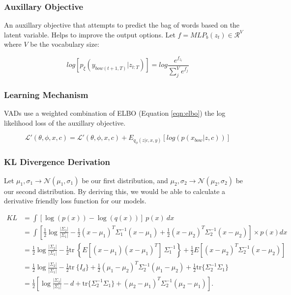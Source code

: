 \documentclass[12pt,twoside]{report}
\begin{document}
\subsubsection{Auxillary Objective}

An auxillary objective that attempts to predict the bag of words based on the latent variable. Helps to improve the output options. Let $f=MLP_b(z_t) \in \mathcal{R}^V$ where $V$ be the vocabulary size:

\begin{equation}
	log [p_\xi(y_{bow(t+1,T)}|z_{t:T}) ] = log  \frac{e^{f_{z_{t}}}}{\sum^V_j e^{f_{j}}}
\end{equation}

\subsubsection{Learning Mechanism}

VADs use a weighted combination of ELBO (Equation \ref{eqn:elbo})  the log likelihood loss of the auxillary objective.

\begin{equation}
	\mathcal{L}'(\theta, \phi, x, c) =\mathcal{L}'(\theta, \phi, x, c) + E_{q_{\phi}(z|c,x,y)}[log(p(x_{bow}|z,c))]
\end{equation}

\subsubsection{KL Divergence Derivation}

Let $\mu_1, \sigma_1 \rightarrow \mathcal{N}(\mu_1,\sigma_1)$ be our first distribution, and $\mu_2, \sigma_2 \rightarrow \mathcal{N}(\mu_2,\sigma_2)$ be our second distribution. By deriving this, we would be able to calculate a derivative friendly loss function for our models.

\begin{equation}
	\label{eq:t}
	\begin{aligned}
	KL &= \int \left[\log( p(x)) - \log( q(x)) \right]\ p(x)\ dx \\
	&= \int \left[ \frac{1}{2} \log\frac{|\Sigma_2|}{|\Sigma_1|} - \frac{1}{2} (x-\mu_1)^T\Sigma_1^{-1}(x-\mu_1) + \frac{1}{2} (x-\mu_2)^T\Sigma_2^{-1}(x-\mu_2) \right] \times p(x) dx \\
	&= \frac{1}{2} \log\frac{|\Sigma_2|}{|\Sigma_1|} - \frac{1}{2} \text{tr}\ \left\{E[(x - \mu_1)(x - \mu_1)^T] \ \Sigma_1^{-1} \right\} + \frac{1}{2} E[(x - \mu_2)^T \Sigma_2^{-1} (x - \mu_2)] \\
	&= \frac{1}{2} \log\frac{|\Sigma_2|}{|\Sigma_1|} - \frac{1}{2} \text{tr}\ \{I_d \} + \frac{1}{2} (\mu_1 - \mu_2)^T \Sigma_2^{-1} (\mu_1 - \mu_2) + \frac{1}{2} \text{tr} \{ \Sigma_2^{-1} \Sigma_1 \} \\
	&= \frac{1}{2}\left[\log\frac{|\Sigma_2|}{|\Sigma_1|} - d + \text{tr} \{ \Sigma_2^{-1}\Sigma_1 \} + (\mu_2 - \mu_1)^T \Sigma_2^{-1}(\mu_2 - \mu_1)\right].
\end{aligned}
\end{equation}
\end{document}
